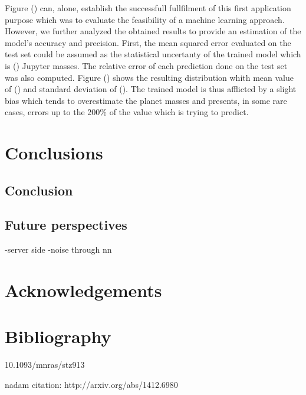 \documentclass[a4paper,10pt]{report}
\begin{document}
Figure () can, alone, establish the successfull fullfilment of this first application purpose which was to evaluate the feasibility of
a machine learning approach. However, we further analyzed the obtained results to provide 
an estimation of the model's accuracy and precision. First, the mean squared error evaluated on the test set could 
be assumed as the statistical uncertanty of the trained model which is () Jupyter masses.
The relative error of each prediction 
done on the test set was also computed. 
Figure () shows the resulting distribution whith mean value of () and standard deviation of (). The trained model
is thus afflicted by a slight bias which tends to overestimate the planet masses and presents, in some rare cases, errors up to
the 200\% of the value which is trying to predict.




\chapter{Conclusions}
\section{Conclusion}
\section{Future perspectives}

-server side
-noise through nn

\chapter*{Acknowledgements}

\chapter*{Bibliography}

10.1093/mnras/stz913

nadam citation: http://arxiv.org/abs/1412.6980
\end{document}
